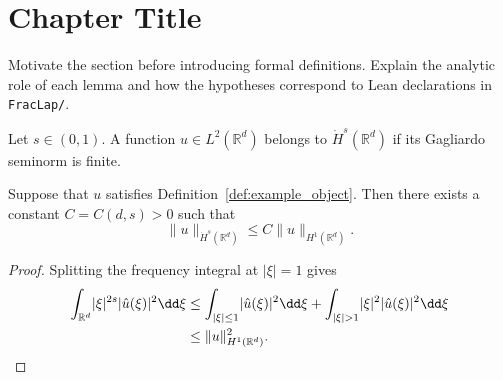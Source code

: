 \chapter{Chapter Title}

Motivate the section before introducing formal definitions. Explain the analytic role of each
lemma and how the hypotheses correspond to Lean declarations in \texttt{FracLap/}.

\begin{definition}\label{def:example_object}
\leanok
Let $s \in (0, 1)$. A function $u \in L^2(\mathbb{R}^d)$ belongs to $\dot{H}^s(\mathbb{R}^d)$ if
its Gagliardo seminorm is finite.
\end{definition}

\begin{lemma}\label{lem:example_bound}
\leanok
Suppose that $u$ satisfies Definition~\ref{def:example_object}. Then there exists a constant
$C = C(d, s) > 0$ such that
\begin{equation}\label{eq:example_bound}
  \lVert u \rVert_{\dot{H}^s(\mathbb{R}^d)} \le C \lVert u \rVert_{H^1(\mathbb{R}^d)}.
\end{equation}
\end{lemma}

\begin{proof}
Splitting the frequency integral at $\lvert \xi \rvert = 1$ gives
\begin{align*}
  \int_{\mathbb{R}^d} \lvert \xi \rvert^{2s} \lvert \hat{u}(\xi) \rvert^2 \dd\xi
  &\le \int_{\lvert \xi \rvert \le 1} \lvert \hat{u}(\xi) \rvert^2 \dd\xi
    + \int_{\lvert \xi \rvert > 1} \lvert \xi \rvert^2 \lvert \hat{u}(\xi) \rvert^2 \dd\xi \\
  &\le \lVert u \rVert_{H^1(\mathbb{R}^d)}^2. \qedhere
\end{align*}
\end{proof}
